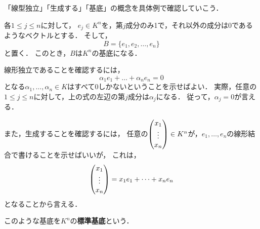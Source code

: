 「線型独立」「生成する」「基底」の概念を具体例で確認していこう．
\begin{example}\label{eg:standard_basis}
    各$1 \le j \le n$に対して，
    $e_j \in K^n$を，第$j$成分のみ1で，それ以外の成分は0であるようなベクトルとする．
    そして，
    \[
        B = \{e_1,e_2,\dots,e_n\}
    \]
    と置く．
    このとき，$B$は$K^n$の基底になる．
    
    線形独立であることを確認するには，
    \[
        \alpha_1 e_1 + \dots + \alpha_n e_n = 0
    \]
    となる$\alpha_1,\dots,\alpha_n \in K$はすべて0しかないということを示せばよい．
    実際，任意の$1 \le j \le n$に対して，上の式の左辺の第$j$成分は$\alpha_j$になる．
    従って，$\alpha_j = 0$が言える．
    
    また，生成することを確認するには，
    任意の$\begin{pmatrix} x_1 \\ \vdots \\ x_n \end{pmatrix} \in K^n$が，$e_1,\dots,e_n$の線形結合で書けることを示せばいいが，
    これは，
    \[
        \begin{pmatrix} x_1 \\ \vdots \\ x_n \end{pmatrix} = x_1 e_1 + \dots + x_n e_n
    \]
    となることから言える．
    
    このような基底を$K^n$の\textbf{標準基底}という．
\end{example}
